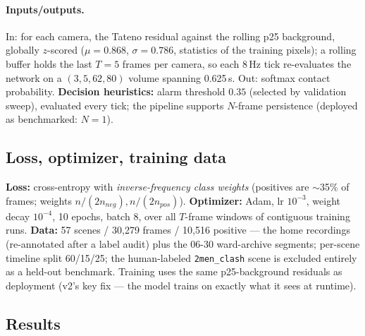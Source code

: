 \documentclass[11pt]{article}
\newcommand{\code}[1]{\texttt{\small #1}}
\begin{document}
\paragraph{Inputs/outputs.} In: for each camera, the Tateno residual
against the rolling p25 background, globally $z$-scored
($\mu{=}0.868$, $\sigma{=}0.786$, statistics of the training pixels); a
rolling buffer holds the last $T{=}5$ frames per camera, so each 8\,Hz tick
re-evaluates the network on a $(3,5,62,80)$ volume spanning 0.625\,s. Out:
softmax contact probability. \textbf{Decision heuristics:} alarm threshold
$0.35$ (selected by validation sweep), evaluated every tick; the pipeline
supports $N$-frame persistence (deployed as benchmarked: $N{=}1$).

\subsection{Loss, optimizer, training data}

\textbf{Loss:} cross-entropy with \emph{inverse-frequency class weights}
(positives are $\sim$35\% of frames; weights $n/(2n_{neg}), n/(2n_{pos})$).
\textbf{Optimizer:} Adam, lr $10^{-3}$, weight decay $10^{-4}$, 10 epochs,
batch 8, over all $T$-frame windows of contiguous training runs.
\textbf{Data:} 57 scenes / 30{,}279 frames / 10{,}516 positive --- the home
recordings (re-annotated after a label audit) plus the 06-30 ward-archive
segments; per-scene timeline split 60/15/25; the human-labeled
\code{2men\_clash} scene is excluded entirely as a held-out benchmark.
Training uses the same p25-background residuals as deployment (v2's key fix
--- the model trains on exactly what it sees at runtime).

\subsection{Results}
\end{document}
